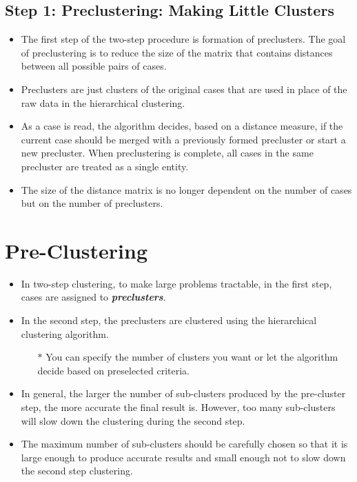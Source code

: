 \documentclass[a4paper,12pt]{article}
\begin{document}
	\subsection{Step 1: Preclustering: Making Little Clusters}
	\begin{itemize}
		\item The first step of the two-step procedure is formation of preclusters. The goal of
		preclustering is to reduce the size of the matrix that contains distances between all
		possible pairs of cases.    \item Preclusters are just clusters of the original cases that are used
		in place of the raw data in the hierarchical clustering.     \item As a case is read, the algorithm
		decides, based on a distance measure, if the current case should be merged with a
		previously formed precluster or start a new precluster. When preclustering is complete,
		all cases in the same precluster are treated as a single entity.     \item The size of the distance
		matrix is no longer dependent on the number of cases but on the number of preclusters.
	\end{itemize}
	





\section{Pre-Clustering}
\begin{itemize}
	\item In two-step clustering, to make large problems tractable, in the first step, cases are
	assigned to \textbf{\textit{preclusters}}. 
	\item In the second step, the preclusters are clustered using the
	hierarchical clustering algorithm. \begin{itemize}
		\item[$\ast$] You can specify the number of clusters you want or
	let the algorithm decide based on preselected criteria.
	\end{itemize}
	\item In general, the larger the number of sub-clusters produced by the pre-cluster step, the more accurate the final result is. However, too many sub-clusters will slow down the clustering during the second step.
	
	\item The maximum number of sub-clusters should be carefully chosen so that it is large enough to produce accurate results and small enough not to slow down the second step clustering.
	
\end{itemize}
\end{document}
